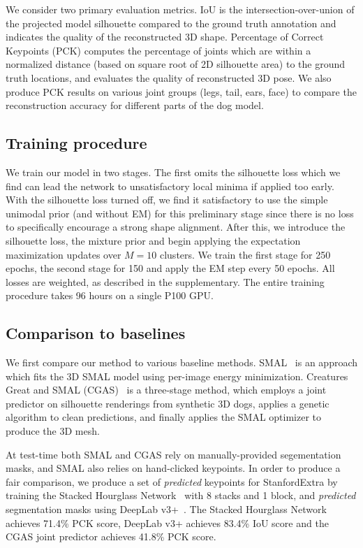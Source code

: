 We consider two primary evaluation metrics. IoU is the intersection-over-union of the projected model silhouette compared to the ground truth annotation and indicates the quality of the reconstructed 3D shape. Percentage of Correct Keypoints (PCK) computes the percentage of joints which are within a normalized distance (based on square root of 2D silhouette area) to the ground truth locations, and evaluates the quality of reconstructed 3D pose. We also produce PCK results on various joint groups (legs, tail, ears, face) to compare the reconstruction accuracy for different parts of the dog model.

\subsection{Training procedure}

We train our model in two stages. The first omits the silhouette loss which we find can lead the network to unsatisfactory local minima if applied too early. With the silhouette loss turned off, we find it satisfactory to use the simple unimodal prior (and without EM) for this preliminary stage since there is no loss to specifically encourage a strong shape alignment. After this, we introduce the silhouette loss, the mixture prior and begin applying the expectation maximization updates over $M=10$ clusters. We train the first stage for 250 epochs, the second stage for 150 and apply the EM step every 50 epochs. All losses are weighted, as described in the supplementary. The entire training procedure takes 96 hours on a single P100 GPU.

\subsection{Comparison to baselines}

We first compare our method to various baseline methods. SMAL~\cite{zuffi2017menagerie} is an approach which fits the 3D SMAL model using per-image energy minimization. Creatures Great and SMAL (CGAS)~\cite{biggs2018creatures} is a three-stage method, which employs a joint predictor on silhouette renderings from synthetic 3D dogs, applies a genetic algorithm to clean predictions, and finally applies the SMAL optimizer to produce the 3D mesh.

At test-time both SMAL and CGAS rely on manually-provided segementation masks, and SMAL also relies on hand-clicked keypoints. In order to produce a fair comparison, we produce a set of \emph{predicted} keypoints for StanfordExtra by training the Stacked Hourglass Network~\cite{newell2016stacked} with 8 stacks and 1 block, and \emph{predicted} segmentation masks using DeepLab v3+~\cite{deeplabv3plus}. The Stacked Hourglass Network achieves 71.4\% PCK score, DeepLab v3+ achieves 83.4\% IoU score and the CGAS joint predictor achieves 41.8\% PCK score. 

